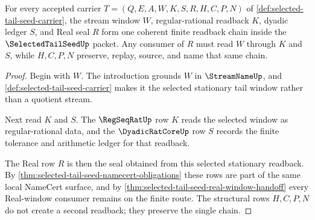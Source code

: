 \begin{theorem}
\label{thm:selected-tail-seed-window-readback-coherence}
For every accepted carrier $T=(Q,E,A,W,K,S,R,H,C,P,N)$ of \autoref{def:selected-tail-seed-carrier}, the stream window $W$, regular-rational readback $K$, dyadic ledger $S$, and Real seal $R$ form one coherent finite readback chain inside the $\SelectedTailSeedUp$ packet. Any consumer of $R$ must read $W$ through $K$ and $S$, while $H,C,P,N$ preserve, replay, source, and name that same chain.
\end{theorem}
\begin{proof}
Begin with $W$. The introduction grounds $W$ in $\StreamNameUp$, and \autoref{def:selected-tail-seed-carrier} makes it the selected stationary tail window rather than a quotient stream.

Next read $K$ and $S$. The $\RegSeqRatUp$ row $K$ reads the selected window as regular-rational data, and the $\DyadicRatCoreUp$ row $S$ records the finite tolerance and arithmetic ledger for that readback.

The Real row $R$ is then the seal obtained from this selected stationary readback. By \autoref{thm:selected-tail-seed-namecert-obligations} these rows are part of the same local NameCert surface, and by \autoref{thm:selected-tail-seed-real-window-handoff} every Real-window consumer remains on the finite route. The structural rows $H,C,P,N$ do not create a second readback; they preserve the single chain.
\end{proof}

